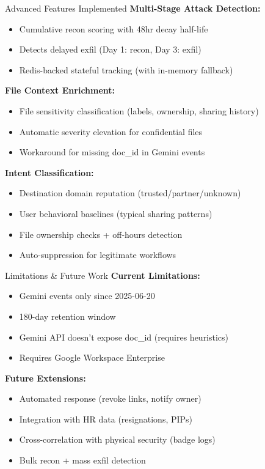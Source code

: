 \documentclass[aspectratio=169]{beamer}
\begin{document}
\begin{frame}{Advanced Features Implemented}
\textbf{Multi-Stage Attack Detection:}
\begin{itemize}
    \item Cumulative recon scoring with 48hr decay half-life
    \item Detects delayed exfil (Day 1: recon, Day 3: exfil)
    \item Redis-backed stateful tracking (with in-memory fallback)
\end{itemize}

\vspace{1em}

\textbf{File Context Enrichment:}
\begin{itemize}
    \item File sensitivity classification (labels, ownership, sharing history)
    \item Automatic severity elevation for confidential files
    \item Workaround for missing doc\_id in Gemini events
\end{itemize}

\vspace{1em}

\textbf{Intent Classification:}
\begin{itemize}
    \item Destination domain reputation (trusted/partner/unknown)
    \item User behavioral baselines (typical sharing patterns)
    \item File ownership checks + off-hours detection
    \item Auto-suppression for legitimate workflows
\end{itemize}
\end{frame}

\begin{frame}{Limitations \& Future Work}
\textbf{Current Limitations:}
\begin{itemize}
    \item Gemini events only since 2025-06-20
    \item 180-day retention window
    \item Gemini API doesn't expose doc\_id (requires heuristics)
    \item Requires Google Workspace Enterprise
\end{itemize}

\vspace{1em}

\textbf{Future Extensions:}
\begin{itemize}
    \item Automated response (revoke links, notify owner)
    \item Integration with HR data (resignations, PIPs)
    \item Cross-correlation with physical security (badge logs)
    \item Bulk recon + mass exfil detection
\end{itemize}
\end{frame}
\end{document}
